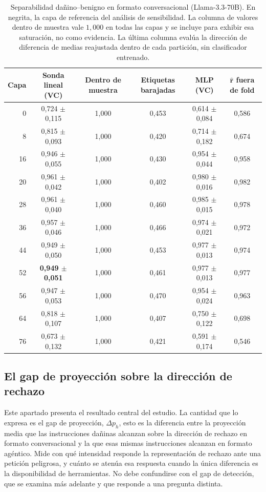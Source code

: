 \documentclass[12pt,a4paper]{article}
\begin{document}
\begin{table}[htbp]
\centering
\small
\setlength{\tabcolsep}{5pt}
\begin{tabular}{@{}rccccc@{}}
\toprule
Capa & Sonda lineal (VC) & Dentro de muestra & Etiquetas barajadas & MLP (VC) & $\hat{\bm{r}}$ fuera de fold \\
\midrule
0  & 0,724 $\pm$ 0,115 & 1,000 & 0,453 & 0,614 $\pm$ 0,084 & 0,586 \\
8  & 0,815 $\pm$ 0,093 & 1,000 & 0,420 & 0,714 $\pm$ 0,182 & 0,674 \\
16 & 0,946 $\pm$ 0,055 & 1,000 & 0,430 & 0,954 $\pm$ 0,044 & 0,958 \\
20 & 0,961 $\pm$ 0,042 & 1,000 & 0,402 & 0,980 $\pm$ 0,016 & 0,982 \\
28 & 0,961 $\pm$ 0,040 & 1,000 & 0,460 & 0,985 $\pm$ 0,015 & 0,978 \\
36 & 0,957 $\pm$ 0,046 & 1,000 & 0,466 & 0,974 $\pm$ 0,021 & 0,972 \\
44 & 0,949 $\pm$ 0,050 & 1,000 & 0,453 & 0,977 $\pm$ 0,013 & 0,974 \\
52 & \textbf{0,949 $\pm$ 0,051} & 1,000 & 0,461 & 0,977 $\pm$ 0,013 & 0,977 \\
56 & 0,947 $\pm$ 0,053 & 1,000 & 0,470 & 0,954 $\pm$ 0,024 & 0,963 \\
64 & 0,818 $\pm$ 0,107 & 1,000 & 0,407 & 0,750 $\pm$ 0,122 & 0,698 \\
76 & 0,673 $\pm$ 0,132 & 1,000 & 0,421 & 0,591 $\pm$ 0,174 & 0,546 \\
\bottomrule
\end{tabular}
\caption{Separabilidad dañino--benigno en formato conversacional (Llama-3.3-70B). En negrita, la capa de referencia del análisis de sensibilidad. La columna de valores dentro de muestra vale $1{,}000$ en todas las capas y se incluye para exhibir esa saturación, no como evidencia. La última columna evalúa la dirección de diferencia de medias reajustada dentro de cada partición, sin clasificador entrenado.}
\label{tab:baseline}
\end{table}

\subsection{El gap de proyección sobre la dirección de rechazo}

\justifying

Este apartado presenta el resultado central del estudio. La cantidad que lo expresa es el gap de proyección, $\Delta p_{h}$, esto es la diferencia entre la proyección media que las instrucciones dañinas alcanzan sobre la dirección de rechazo en formato conversacional y la que esas mismas instrucciones alcanzan en formato agéntico. Mide con qué intensidad responde la representación de rechazo ante una petición peligrosa, y cuánto se atenúa esa respuesta cuando la única diferencia es la disponibilidad de herramientas. No debe confundirse con el gap de detección, que se examina más adelante y que responde a una pregunta distinta.
\end{document}
